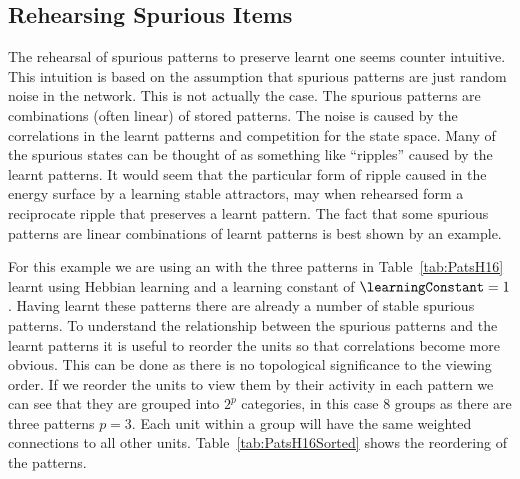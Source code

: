 
\subsection{Rehearsing Spurious Items}
\label{sec:PreservingSpuriousItems}
The rehearsal of spurious patterns to preserve learnt one seems counter intuitive.  This intuition is based on the assumption that spurious patterns are just random noise in the network.  This is not actually the case.  The spurious patterns are combinations (often linear) of stored patterns.  The noise is caused by the correlations in the learnt patterns and competition for the state space.  Many of the spurious states can be thought of as something like ``ripples'' caused by the learnt patterns.  It would seem that the particular form of ripple caused in the energy surface by a learning stable attractors, may when rehearsed form a reciprocate ripple that preserves a learnt pattern.  The fact that some spurious patterns are linear combinations of learnt patterns is best shown by an example.

For this example we are using an  with the three patterns in Table~\ref{tab:PatsH16} learnt using Hebbian learning and a learning constant of $\learningConstant=1$.  Having learnt these patterns there are already a number of stable spurious patterns.  To understand the relationship between the spurious patterns and the learnt patterns it is useful to reorder the units so that correlations become more obvious.  This can be done as there is no topological significance to the viewing order. If we reorder the units to view them by their activity in each pattern we can see that they are grouped into $2^p$ categories, in this case 8 groups as there are three patterns $p=3$.  Each unit within a group will have the same weighted connections to all other units. Table~\ref{tab:PatsH16Sorted} shows the reordering of the patterns.
 
